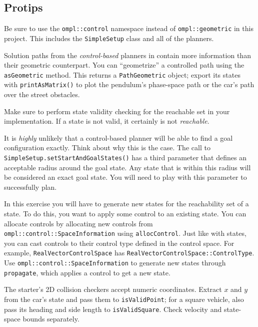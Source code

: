 \documentclass{comp450}
\begin{document}
\subsection*{Protips}
\begin{itemize*}
	\item %
	      Be sure to use the \texttt{ompl::control} namespace instead of \texttt{ompl::geometric} in this project.
	      This includes the \texttt{SimpleSetup} class and all of the planners.
	\item %
	      Solution paths from the \textit{control-based} planners in \ompl contain more information than their geometric counterpart.
	      You can ``geometrize'' a controlled path using the \texttt{asGeometric} method.
	      This returns a \texttt{PathGeometric} object; export its states with \texttt{printAsMatrix()} to plot the pendulum's phase-space path or the car's path over the street obstacles.
	\item %
	      Make sure to perform state validity checking for the reachable set in your  implementation.
	      If a state is not valid, it certainly is not \textit{reachable}.
	\item %
	      It is \emph{highly} unlikely that a control-based planner will be able to find a goal configuration exactly.
	      Think about why this is the case.
	      The call to \texttt{SimpleSetup.setStartAndGoalStates()} has a third parameter that defines an acceptable radius around the goal state.
	      Any state that is within this radius will be considered an exact goal state.
	      You will need to play with this parameter to successfully plan.
	\item %
	      In this exercise you will have to generate new states for the reachability set of a state.
	      To do this, you want to apply some control to an existing state.
	      You can allocate controls by allocating new controls from \texttt{ompl::control::SpaceInformation} using \texttt{allocControl}.
	      Just like with states, you can cast controls to their control type defined in the control space.
	      For example, \texttt{RealVectorControlSpace} has \texttt{RealVectorControlSpace::ControlType}.
	      Use \texttt{ompl::control::SpaceInformation} to generate new states through \texttt{propagate}, which applies a control to get a new state.
	\item The starter's 2D collision checkers accept numeric coordinates. Extract $x$ and $y$ from the car's state and pass them to \texttt{isValidPoint}; for a square vehicle, also pass its heading and side length to \texttt{isValidSquare}. Check velocity and state-space bounds separately.


\end{itemize*}
\end{document}
